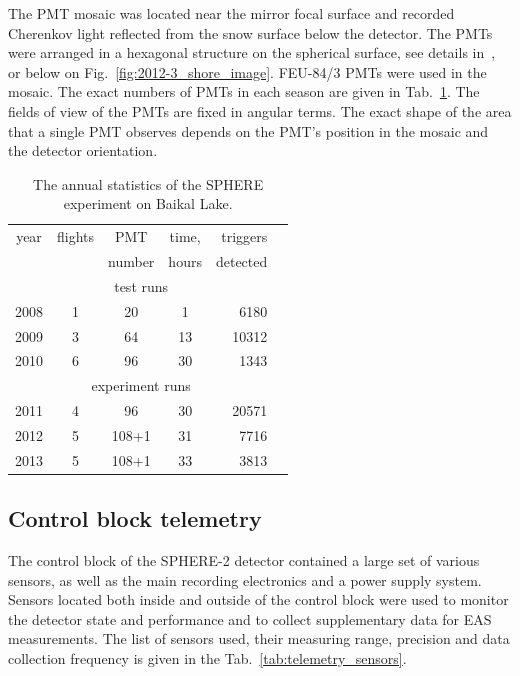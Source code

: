 \documentclass[final,5p,times,twocolumn]{elsarticle}
\begin{document}
The PMT mosaic was located near the mirror focal surface and recorded Cherenkov light reflected from the snow surface below the detector. The PMTs were arranged in a hexagonal structure on the spherical surface, see details in~\cite{Ant20}, or below on Fig.~\ref{fig:2012-3_shore_image}. FEU-84/3 PMTs were used in the mosaic. The exact numbers of PMTs in each season are given in Tab.~\ref{tab:statistics}. The fields of view of the PMTs are fixed in angular terms. The exact shape of the area that a single PMT observes depends on the PMT's position in the mosaic and the detector orientation.

\begin{table}[tb]
\centering
\caption{The annual statistics of the SPHERE experiment on Baikal Lake.
}
\label{tab:statistics}
\vspace{1pc}
\begin{tabular}{|c||c|c|c|r|r|}
    \hline
    year  & flights & PMT    & time, & triggers \\ 
          &         & number & hours & detected \\ 
    \hline \hline
    \multicolumn{5}{|c|}{test runs} \\
    \hline
    2008 & 1 &  20 &  1 &  6180 \\ 
    2009 & 3 &  64 & 13 & 10312 \\ 
    2010 & 6 &  96 & 30 &  1343 \\
    \hline
    \multicolumn{5}{|c|}{experiment runs} \\
    \hline
    2011 & 4 &  96 & 30 & 20571 \\
    2012 & 5 & 108+1 & 31 &  7716 \\
    2013 & 5 & 108+1 & 33 &  3813 \\
    \hline
\end{tabular}
\end{table}

\subsection{Control block telemetry}

The control block of the SPHERE-2 detector contained a large set of various sensors, as well as the main recording electronics and a power supply system. Sensors located both inside and outside of the control block were used to monitor the detector state and performance and to collect supplementary data for EAS measurements. The list of sensors used, their measuring range, precision and data collection frequency is given in the Tab.~\ref{tab:telemetry_sensors}. 
\end{document}
